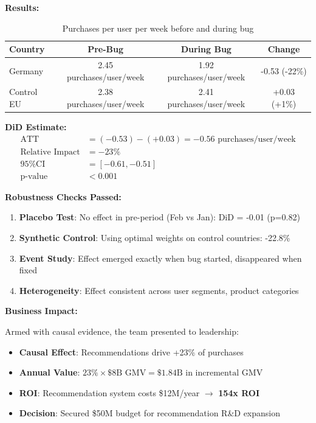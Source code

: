 \textbf{Results:}

\begin{table}[h]
\centering
\begin{tabular}{lccc}
\hline
\textbf{Country} & \textbf{Pre-Bug} & \textbf{During Bug} & \textbf{Change} \\
\hline
Germany & 2.45 purchases/user/week & 1.92 purchases/user/week & -0.53 (-22\%) \\
Control EU & 2.38 purchases/user/week & 2.41 purchases/user/week & +0.03 (+1\%) \\
\hline
\end{tabular}
\caption{Purchases per user per week before and during bug}
\end{table}

\textbf{DiD Estimate:}
\begin{align*}
\text{ATT} &= (-0.53) - (+0.03) = -0.56 \text{ purchases/user/week} \\
\text{Relative Impact} &= -23\% \\
\text{95\% CI} &= [-0.61, -0.51] \\
\text{p-value} &< 0.001
\end{align*}

\textbf{Robustness Checks Passed:}
\begin{enumerate}
    \item \textbf{Placebo Test}: No effect in pre-period (Feb vs Jan): DiD = -0.01 (p=0.82)
    \item \textbf{Synthetic Control}: Using optimal weights on control countries: -22.8\%
    \item \textbf{Event Study}: Effect emerged exactly when bug started, disappeared when fixed
    \item \textbf{Heterogeneity}: Effect consistent across user segments, product categories
\end{enumerate}

\textbf{Business Impact:}

Armed with causal evidence, the team presented to leadership:

\begin{itemize}
    \item \textbf{Causal Effect}: Recommendations drive +23\% of purchases
    \item \textbf{Annual Value}: $23\% \times \$8\text{B GMV} = \$1.84\text{B in incremental GMV}$
    \item \textbf{ROI}: Recommendation system costs \$12M/year $\to$ \textbf{154x ROI}
    \item \textbf{Decision}: Secured \$50M budget for recommendation R\&D expansion
\end{itemize}

